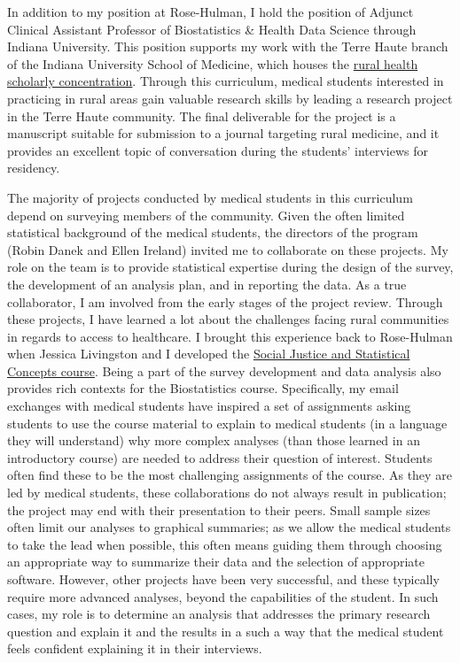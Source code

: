 \documentclass[
  letterpaper,
  DIV=11,
  numbers=noendperiod]{scrreprt}
\begin{document}
In addition to my position at Rose-Hulman, I hold the position of
Adjunct Clinical Assistant Professor of Biostatistics \& Health Data
Science through Indiana University. This position supports my work with
the Terre Haute branch of the Indiana University School of Medicine,
which houses the
\href{https://medicine.iu.edu/md/curriculum/scholarly-concentrations/rural-health}{rural
health scholarly concentration}. Through this curriculum, medical
students interested in practicing in rural areas gain valuable research
skills by leading a research project in the Terre Haute community. The
final deliverable for the project is a manuscript suitable for
submission to a journal targeting rural medicine, and it provides an
excellent topic of conversation during the students' interviews for
residency.

The majority of projects conducted by medical students in this
curriculum depend on surveying members of the community. Given the often
limited statistical background of the medical students, the directors of
the program (Robin Danek and Ellen Ireland) invited me to collaborate on
these projects. My role on the team is to provide statistical expertise
during the design of the survey, the development of an analysis plan,
and in reporting the data. As a true collaborator, I am involved from
the early stages of the project review. Through these projects, I have
learned a lot about the challenges facing rural communities in regards
to access to healthcare. I brought this experience back to Rose-Hulman
when Jessica Livingston and I developed the
\href{https://www.rose-hulman.edu/news/2023/interdisciplinary-course-bridges-data-science-and-storytelling.html}{Social
Justice and Statistical Concepts course}. Being a part of the survey
development and data analysis also provides rich contexts for the
Biostatistics course. Specifically, my email exchanges with medical
students have inspired a set of assignments asking students to use the
course material to explain to medical students (in a language they will
understand) why more complex analyses (than those learned in an
introductory course) are needed to address their question of interest.
Students often find these to be the most challenging assignments of the
course. As they are led by medical students, these collaborations do not
always result in publication; the project may end with their
presentation to their peers. Small sample sizes often limit our analyses
to graphical summaries; as we allow the medical students to take the
lead when possible, this often means guiding them through choosing an
appropriate way to summarize their data and the selection of appropriate
software. However, other projects have been very successful, and these
typically require more advanced analyses, beyond the capabilities of the
student. In such cases, my role is to determine an analysis that
addresses the primary research question and explain it and the results
in a such a way that the medical student feels confident explaining it
in their interviews.
\end{document}

